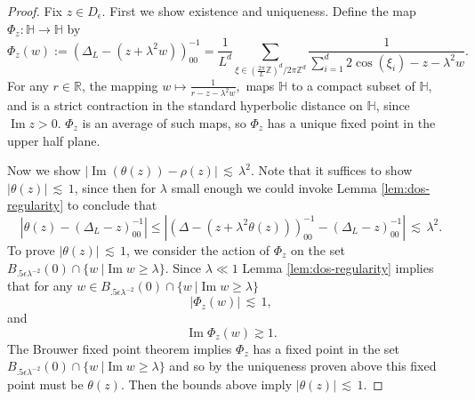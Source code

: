 \documentclass[11pt]{amsart}
\def\R{{\mathbb{R}}}
\def\bbZ{{\mathbb Z}}
\newcommand{\Impt}{\operatorname*{Im}}
\def\lsim{{\,\lesssim\,}}
\numberwithin{equation}{section}
\numberwithin{theorem}{section}
\begin{document}
\begin{proof}
Fix $z\in D_{\epsilon}$. First we show existence and uniqueness.
Define the map $\Phi_z:\mathbb{H}\to\mathbb{H}$ by
$$\Phi_z(w) := (\Delta_L - (z+\lambda^2 w))^{-1}_{00} =  \frac{1}{L^d}\sum_{\xi\in (\frac{2\pi}{L}\bbZ)^d/2\pi \bbZ^d} \frac{1}{\sum_{i=1}^d 2\cos(\xi_i) - z- \lambda^2w}.$$
For any $r\in \R$, the mapping $w\mapsto \frac{1}{r-z-\lambda^2 w},$ maps $\mathbb{H}$ to a compact subset of $\mathbb{H}$, and is a strict contraction in the standard hyperbolic distance on $\mathbb{H}$, since $\Impt z>0$.
$\Phi_z$ is an average of such maps, so $\Phi_z$ has a unique fixed point in the upper half plane.

Now we show $|\Impt(\theta(z)) - \rho(z)| \lsim \lambda^{2}$. Note that it suffices to show
$|\theta(z)|\lsim 1$, since then for $\lambda$ small enough we could invoke Lemma \ref{lem:dos-regularity} to conclude that
$$|\theta(z) - (\Delta_L - z)_{00}^{-1}|\leq |(\Delta -(z+\lambda^2\theta(z)))^{-1}_{00}-(\Delta_L-z)^{-1}_{00}|\lsim \lambda^2.$$
To prove $|\theta(z)|\lsim 1$, we consider the action of $\Phi_z$ on the set
$B_{.5\epsilon\lambda^{-2}}(0)\cap \{w\ | \Impt w\geq\lambda\}$. Since $\lambda \ll 1$ Lemma \ref{lem:dos-regularity} implies that for any $w\in B_{.5\epsilon\lambda^{-2}}(0)\cap \{w\ | \Impt w\geq\lambda\}$
$$|\Phi_z(w)|\lsim 1,$$
and
$$\Impt \Phi_z(w)\gtrsim 1.$$
The Brouwer fixed point theorem implies $\Phi_z$ has a fixed point in the set $B_{.5\epsilon\lambda^{-2}}(0)\cap \{w\ | \Impt w\geq\lambda\}$ and so by the uniqueness proven above this fixed point must be $\theta(z)$. Then the bounds above imply $|\theta(z)|\lsim 1.$




\end{proof}

\printbibliography
\end{document}
